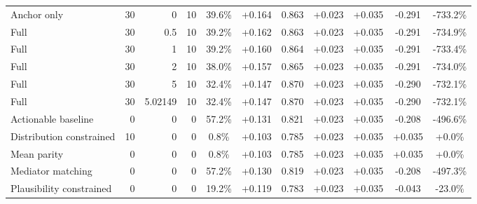 \begin{table}[htbp]
\begin{tabular}{lrrrccccccc}
Anchor only & 30 & 0 & 10 & 39.6\% & +0.164 & 0.863 & +0.023 & +0.035 & -0.291 & -733.2\% \\
Full & 30 & 0.5 & 10 & 39.2\% & +0.162 & 0.863 & +0.023 & +0.035 & -0.291 & -734.9\% \\
Full & 30 & 1 & 10 & 39.2\% & +0.160 & 0.864 & +0.023 & +0.035 & -0.291 & -733.4\% \\
Full & 30 & 2 & 10 & 38.0\% & +0.157 & 0.865 & +0.023 & +0.035 & -0.291 & -734.0\% \\
Full & 30 & 5 & 10 & 32.4\% & +0.147 & 0.870 & +0.023 & +0.035 & -0.290 & -732.1\% \\
Full & 30 & 5.02149 & 10 & 32.4\% & +0.147 & 0.870 & +0.023 & +0.035 & -0.290 & -732.1\% \\
Actionable baseline & 0 & 0 & 0 & 57.2\% & +0.131 & 0.821 & +0.023 & +0.035 & -0.208 & -496.6\% \\
Distribution constrained & 10 & 0 & 0 & 0.8\% & +0.103 & 0.785 & +0.023 & +0.035 & +0.035 & +0.0\% \\
Mean parity & 0 & 0 & 0 & 0.8\% & +0.103 & 0.785 & +0.023 & +0.035 & +0.035 & +0.0\% \\
Mediator matching & 0 & 0 & 0 & 57.2\% & +0.130 & 0.819 & +0.023 & +0.035 & -0.208 & -497.3\% \\
Plausibility constrained & 0 & 0 & 0 & 19.2\% & +0.119 & 0.783 & +0.023 & +0.035 & -0.043 & -23.0\% \\
\bottomrule
\end{tabular}
\end{table}